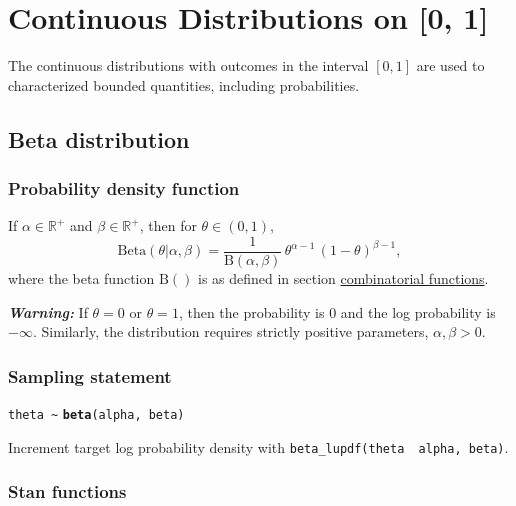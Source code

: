 \documentclass[
  10pt,
]{book}
\begin{document}
\hypertarget{continuous-distributions-on-0-1}{%
\chapter{Continuous Distributions on {[}0, 1{]}}\label{continuous-distributions-on-0-1}}

The continuous distributions with outcomes in the interval \([0,1]\) are
used to characterized bounded quantities, including probabilities.

\hypertarget{beta-distribution}{%
\section{Beta distribution}\label{beta-distribution}}

\hypertarget{probability-density-function-21}{%
\subsection{Probability density function}\label{probability-density-function-21}}

If \(\alpha \in \mathbb{R}^+\) and \(\beta \in \mathbb{R}^+\), then for
\(\theta \in (0,1)\), \[ \text{Beta}(\theta|\alpha,\beta) =
\frac{1}{\mathrm{B}(\alpha,\beta)} \, \theta^{\alpha - 1} \, (1 -
\theta)^{\beta - 1} , \] where the beta function \(\mathrm{B}()\) is as
defined in section \protect\hyperlink{betafun}{combinatorial functions}.

\emph{\textbf{Warning:}} If \(\theta = 0\) or \(\theta = 1\), then the probability
is 0 and the log probability is \(-\infty\). Similarly, the
distribution requires strictly positive parameters, \(\alpha, \beta > 0\).

\hypertarget{sampling-statement-45}{%
\subsection{Sampling statement}\label{sampling-statement-45}}

\texttt{theta\ \textasciitilde{}} \textbf{\texttt{beta}}\texttt{(alpha,\ beta)}

Increment target log probability density with \texttt{beta\_lupdf(theta\ \textbar{}\ alpha,\ beta)}.

\hypertarget{stan-functions-44}{%
\subsection{Stan functions}\label{stan-functions-44}}
\end{document}
